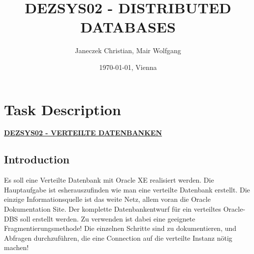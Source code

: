 \documentclass[11pt,a4paper]{article}
\title{\bf DEZSYS02 - DISTRIBUTED DATABASES}
\author{Janeczek Christian, Mair Wolfgang}
\affil{IT Department TGM, Vienna}
\date{\today{}, Vienna}
\begin{document}
\maketitle
\newpage
\tableofcontents
\newpage

\section{Task Description}
\textbf{\underline{DEZSYS02 - VERTEILTE DATENBANKEN}}

\subsection{Introduction}
Es soll eine Verteilte Datenbank mit Oracle XE realisiert werden. Die Hauptaufgabe ist esherauszufinden wie man eine verteilte Datenbank erstellt. Die einzige Informationsquelle ist das weite Netz, allem voran die Oracle Dokumentation Site. Der komplette Datenbankentwurf für ein
verteiltes Oracle-DBS soll erstellt werden. Zu verwenden ist dabei eine geeignete
Fragmentierungsmethode! Die einzelnen Schritte sind zu dokumentieren, und Abfragen
durchzuführen, die eine Connection auf die verteilte Instanz nötig machen!
\end{document}
